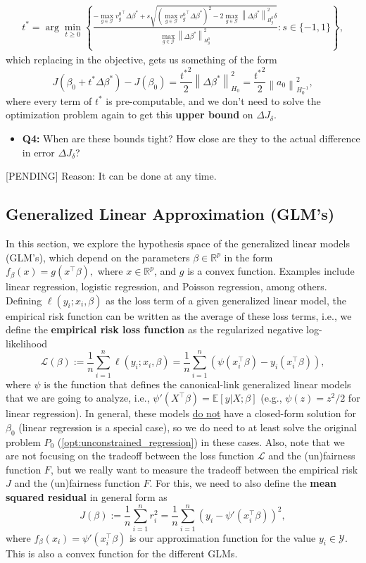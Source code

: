 \documentclass[11pt]{article}
\theoremstyle{plain}
\theoremstyle{definition}
\newcommand{\R}{\mathbb{R}}
\newcommand{\norm}[1]{\left\lVert #1 \right\rVert}
\newcommand{\1}{\mathbf{1}}
\newcommand{\Y}{\mathcal{Y}}
\newcommand{\G}{\mathcal{G}}
\renewcommand{\L}{\mathcal{L}}
\renewcommand{\t}{^{\top}}
\newcommand{\Expected}[1]{\mathbb{E}[#1]}
\renewcommand{\R}{\mathbb{R}}
\begin{document}
\begin{align*}
    t^*=\arg\min_{t \geq 0} \left\{\frac{-\max_{g\in \G} {v_g^0}\t \Delta \beta^* + s \sqrt{(\max_{g\in \G} {v_g^0}\t \Delta \beta^*)^2- 2\max_{g\in \G} \norm{\Delta \beta^*}_{H_g^0}^2 \delta}  }{\max_{g\in \G} \norm{\Delta \beta^*}_{H_g^0}^2} : s\in{\{-1,1\}}\right\},
\end{align*}
which replacing in the objective, gets us something of the form 
\begin{equation}
    \boxed{J(\beta_0 + t^*\Delta \beta^*) - J(\beta_0)= \frac{{t^*}^2}{2}\norm{ \Delta \beta^*}^2_{H_0} = \frac{{t^*}^2}{2}\norm{ a_0}^2_{H_0^{-1}}},
\end{equation}
where every term of $t^*$ is pre-computable, and we don't need to solve the optimization problem again to get this \textbf{upper bound} on $\Delta J_\delta$. 

\begin{itemize}
    \item \textbf{Q4:} When are these bounds tight? How close are they to the actual difference in error $\Delta J_\delta$?
\end{itemize}
\medskip

{\color{red} [PENDING] Reason: It can be done at any time.}

\subsection{Generalized Linear Approximation (GLM's)}

In this section, we explore the hypothesis space of the generalized linear models (GLM's), which depend on the parameters $\beta \in \R^p$ in the form $f_\beta(x)=g(x^{\top}\beta),$ where $x\in \R^p$, and $g$ is a convex function. Examples include linear regression, logistic regression, and Poisson regression, among others. Defining $\ell(y_i;x_i,\beta)$ as the loss term of a given generalized linear model, the empirical risk function can be written as the average of these loss terms, i.e., we define the \textbf{empirical risk loss function} as the regularized negative log-likelihood
$$
\L(\beta):= \frac{1}{n}\sum_{i=1}^n \ell(y_i;x_i,\beta) =\frac{1}{n}\sum_{i=1}^n (\psi(x_i\t\beta) - y_i(x_i\t\beta)),
$$ where $\psi$ is the function that defines the canonical-link generalized linear models that we are going to analyze, i.e., $\psi'(X\t \beta)=\Expected{y|X;\beta}$ (e.g., $\psi(z)={z^2}/{2}$ for linear regression). In general, these models \underline{do not} have a closed-form solution for $\beta_0$ (linear regression is a special case), so we do need to at least solve the original problem $P_0$ (\ref{opt:unconstrained_regression}) in these cases. Also, note that we are not focusing on the tradeoff between the loss function $\L$ and the (un)fairness function $F$, but we really want to measure the tradeoff between the empirical risk $J$ and the (un)fairness function $F$. For this, we need to also define the \textbf{mean squared residual} in general form as
$$
J(\beta):= \frac{1}{n}\sum_{i=1}^n r_i^2 = \frac{1}{n}\sum_{i=1}^n \left(y_i - \psi'(x_i\t\beta)\right)^2,
$$
where $f_\beta(x_i)=\psi'(x_i\t\beta)$ is our approximation function for the value $y_i \in \Y$. This is also a convex function for the different GLMs. 
\end{document}
